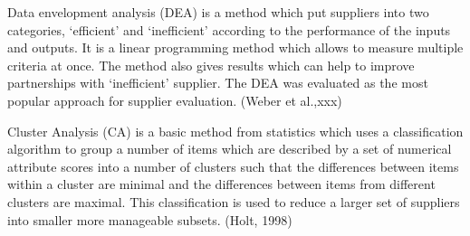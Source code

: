 \documentclass[oneside,12pt]{article}%
\begin{document}
Data envelopment analysis (DEA) is a method which put suppliers into two categories, ‘efficient’ and ‘inefficient’ according to the performance of the inputs and outputs. It is a linear programming method which allows to measure multiple criteria at once. The method also gives results which can help to improve partnerships with ‘inefficient’ supplier. The DEA was evaluated as the most popular approach for supplier evaluation. (Weber et al.,xxx) \par

Cluster Analysis (CA) is a basic method from statistics which uses a classification algorithm to group a number of items which are described by a set of numerical attribute scores into a number of clusters such that the differences between items within a cluster are minimal and the differences between items from different clusters are maximal. This classification is used to reduce a larger set of suppliers into smaller more manageable subsets. (Holt, 1998)
\end{document}
